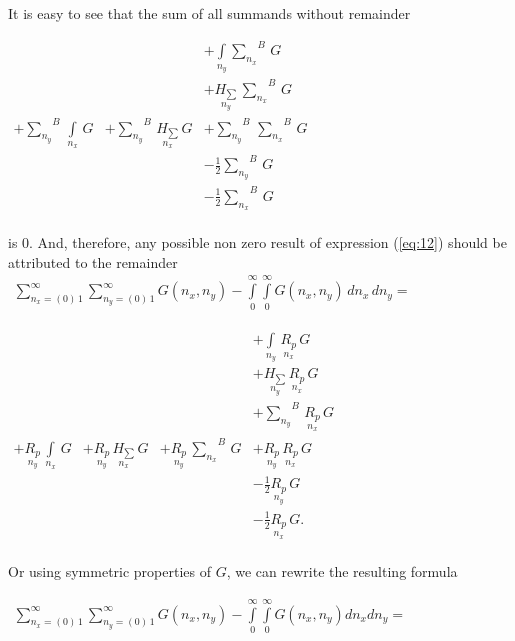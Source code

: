 \documentclass[twoside, 10pt]{article}
\begin{document}
\begin{multicols}{2}
    It is easy to see that the sum of all summands without remainder

    \(\begin{array}{llll}  \,&  \,&  + \int\limits_{n_y}^{}{\sum\limits_{n_x}^{}}^{B}\,G \\  \,&  \,&  + \underset{n_y}{H_{\sum}}\,{\sum\limits_{n_x}^{}}^{B}\,G \\  + {\sum\limits_{n_y}^{}}^{B}\,\int\limits_{n_x}^{}\,G &  + {\sum\limits_{n_y}^{}}^{B}\,\underset{n_x}{H_{\sum}}\,G &  + {\sum\limits_{n_y}^{}}^{B}\,{\sum\limits_{n_x}^{}}^{B}\,G\\  \,&  \,&  - \frac{1}{2}{\sum\limits_{n_y}^{}}^{B}\,G \\  \,&  \,&  - \frac{1}{2}{\sum\limits_{n_x}^{}}^{B}\,G \\ \end{array}\)

    is 0. And, therefore, any possible non zero result of expression (\ref{eq:12}) should be attributed to the remainder
\noindent
    \(\begin{array}{r} \sum\limits_{n_x=\left(0\right)\,1}^{\infty} \sum\limits_{n_y=\left(0\right)\,1}^{\infty} G\left(n_x, n_y\right) - \int\limits_{0}^{\infty} \int\limits_{0}^{\infty} G\left(n_x, n_y\right)\,d{n_x}\,d{n_y} = \end{array}\)

    \(\begin{array}{llll}  \,&  \,&  \,&  + \int\limits_{n_y}^{}\,\underset{n_x}{R_{p}}\,G \\  \,&  \,&  \,&  + \underset{n_y}{H_{\sum}}\,\underset{n_x}{R_{p}}\,G \\  \,&  \,&  \,&  + {\sum\limits_{n_y}^{}}^{B}\,\underset{n_x}{R_{p}}\,G \\  + \underset{n_y}{R_{p}}\,\int\limits_{n_x}^{}\,G &  + \underset{n_y}{R_{p}}\,\underset{n_x}{H_{\sum}}\,G &  + \underset{n_y}{R_{p}}\,{\sum\limits_{n_x}^{}}^{B}\,G &  + \underset{n_y}{R_{p}}\,\underset{n_x}{R_{p}}\,G \\  \,&  \,&  \,&  - \frac{1}{2}\underset{n_y}{R_{p}}\,G \\  \,&  \,&  \,&  - \frac{1}{2}\underset{n_x}{R_{p}}\,G. \\ \end{array}\)

    Or using symmetric properties of \(G\), we can rewrite the resulting formula

\noindent
    \(\begin{array}{r} \sum\limits_{n_x=\left(0\right)\,1}^{\infty} \sum\limits_{n_y=\left(0\right)\,1}^{\infty} G\left(n_x, n_y\right) - \int\limits_{0}^{\infty} \int\limits_{0}^{\infty} G\left(n_x, n_y\right) d{n_x} d{n_y} = \end{array}\)


\end{multicols}
\end{document}
